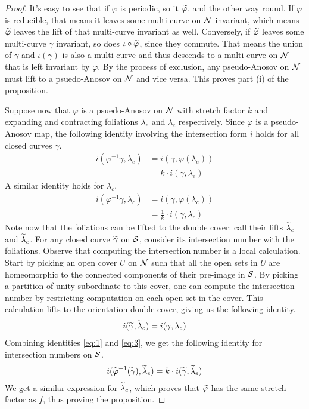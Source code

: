 \begin{proof}
  It's easy to see that if $\varphi$ is periodic, so it $\widetilde{\varphi}$, and the other way round. If $\varphi$
  is reducible, that means it leaves some multi-curve on $\mathcal{N}$ invariant, which means $\widetilde{\varphi}$ leaves
  the lift of that multi-curve invariant as well. Conversely, if $\widetilde{\varphi}$ leaves some multi-curve
  $\gamma$ invariant, so does $\iota \circ \widetilde{\varphi}$, since they commute. That means the union of $\gamma$
  and $\iota(\gamma)$ is also a multi-curve and thus descends to a multi-curve on $\mathcal{N}$ that is left invariant
  by $\varphi$. By the process of exclusion, any pseudo-Anosov on $\mathcal{N}$ must lift to a psuedo-Anosov on $\mathcal{N}$
  and vice versa. This proves part (i) of the proposition.

  Suppose now that $\varphi$ is a psuedo-Anosov on $\mathcal{N}$ with stretch factor $k$ and expanding and contracting
  foliations $\lambda_e$ and $\lambda_c$ respectively. Since $\varphi$ is a pseudo-Anosov map, the following
  identity involving the intersection form $i$ holds for all closed curves $\gamma$.
  \begin{align}
    \label{eq:1}
    i(\varphi^{-1}\gamma, \lambda_e) &= i(\gamma, \varphi(\lambda_e)) \\
                               &= k \cdot i(\gamma, \lambda_e)
  \end{align}
  A similar identity holds for $\lambda_c$.
  \begin{align}
    \label{eq:2}
    i(\varphi^{-1}\gamma, \lambda_c) &= i(\gamma, \varphi(\lambda_c)) \\
                               &= \frac{1}{k} \cdot i(\gamma, \lambda_c)
  \end{align}
  Note now that the foliations can be lifted to the double cover: call their lifts $\widetilde{\lambda}_e$ and
  $\widetilde{\lambda}_c$. For any closed curve $\widetilde{\gamma}$ on $\mathcal{S}$, consider its intersection number with the
  foliations. Observe that computing the intersection number is a local calculation. Start by picking an open
  cover $U$ on $\mathcal{N}$ such that all the open sets in $U$ are homeomorphic to the connected components of their
  pre-image in $\mathcal{S}$. By picking a partition of unity subordinate to this cover, one can compute the intersection
  number by restricting computation on each open set in the cover. This calculation lifts to the orientation double
  cover, giving us the following identity.
  \begin{align}
    \label{eq:3}
    i(\widetilde{\gamma}, \widetilde{\lambda}_e) = i(\gamma, \lambda_e)
  \end{align}
  Combining identities \eqref{eq:1} and \eqref{eq:3}, we get the following identity for intersection numbers
  on $\mathcal{S}$.
  \begin{align*}
    i(\widetilde{\varphi}^{-1} (\widetilde{\gamma}), \widetilde{\lambda}_e) = k \cdot i(\widetilde{\gamma}, \widetilde{\lambda}_e)
  \end{align*}
  We get a similar expression for $\widetilde{\lambda}_c$, which proves that $\widetilde{\varphi}$ has the same stretch factor
  as $f$, thus proving the proposition.
\end{proof}
